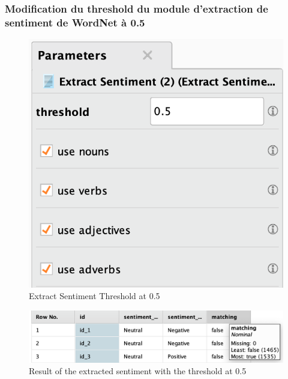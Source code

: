 \documentclass[a4paper]{article}
\begin{document}
\subsubsection{Modification du threshold du module d'extraction de sentiment de WordNet à 0.5}
\begin{figure}[H]
\begin{center}
	\includegraphics[width=\linewidth/3]{imgs/part_3/3_processing_documents_full_0_5}
	\caption{Extract Sentiment Threshold at 0.5}
	\label{fig:3_processing_documents_full_0_5}
\end{center}
\end{figure}
\begin{figure}[H]
	\includegraphics[width=\linewidth]{imgs/part_3/3_processing_documents_full_0_5_results}
	\caption{Result of the extracted sentiment with the threshold at 0.5}
	\label{fig:3_processing_documents_full_0_5_results}
\end{figure}
\end{document}
